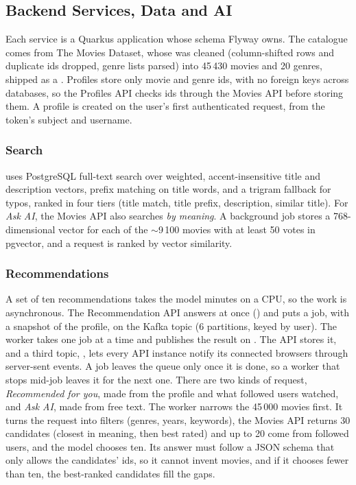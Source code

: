 \subsection{Backend Services, Data and AI}

Each service is a Quarkus application whose schema Flyway owns. The catalogue comes from The Movies Dataset, whose  was cleaned (column-shifted rows and duplicate ids dropped, genre lists parsed) into 45\,430 movies and 20 genres, shipped as a . Profiles store only movie and genre ids, with no foreign keys across databases, so the Profiles API checks ids through the Movies API before storing them. A profile is created on the user's first authenticated request, from the token's subject and username.

\subsubsection{Search}  uses PostgreSQL full-text search over weighted, accent-insensitive title and description vectors, prefix matching on title words, and a trigram fallback for typos, ranked in four tiers (title match, title prefix, description, similar title). For \emph{Ask AI}, the Movies API also searches \emph{by meaning}. A background job stores a 768-dimensional  vector for each of the $\sim$9\,100 movies with at least 50 votes in pgvector, and a request is ranked by vector similarity.

\subsubsection{Recommendations} A set of ten recommendations takes the model minutes on a CPU, so the work is asynchronous. The Recommendation API answers at once () and puts a job, with a snapshot of the profile, on the Kafka topic  (6 partitions, keyed by user). The worker takes one job at a time and publishes the result on . The API stores it, and a third topic, , lets every API instance notify its connected browsers through server-sent events. A job leaves the queue only once it is done, so a worker that stops mid-job leaves it for the next one. There are two kinds of request, \emph{Recommended for you}, made from the profile and what followed users watched, and \emph{Ask AI}, made from free text. The worker narrows the 45\,000 movies first. It turns the request into filters (genres, years, keywords), the Movies API returns 30 candidates (closest in meaning, then best rated) and up to 20 come from followed users, and the model chooses ten. Its answer must follow a JSON schema that only allows the candidates' ids, so it cannot invent movies, and if it chooses fewer than ten, the best-ranked candidates fill the gaps.

